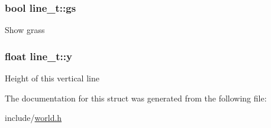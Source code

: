\subsubsection[{gs}]{\setlength{\rightskip}{0pt plus 5cm}bool line\+\_\+t\+::gs}\label{structline__t_a06568d82429331a242b9e6f45a36ae6d}
Show grass \hypertarget{structline__t_a77fb44a40c2154411e5af6cf39194b30}{}
\subsubsection[{y}]{\setlength{\rightskip}{0pt plus 5cm}float line\+\_\+t\+::y}\label{structline__t_a77fb44a40c2154411e5af6cf39194b30}
Height of this vertical line 

The documentation for this struct was generated from the following file\+:\begin{DoxyCompactItemize}
\item 
include/\hyperlink{world_8h}{world.\+h}\end{DoxyCompactItemize}
